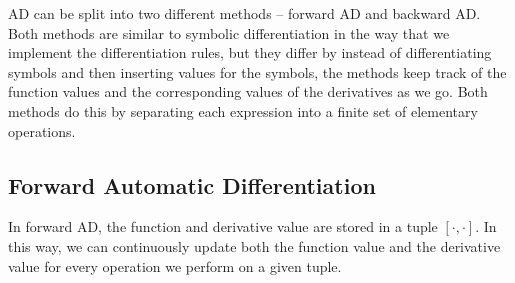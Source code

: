 AD can be split into two different methods -- forward AD and backward AD. Both methods are similar to symbolic differentiation in the way that we implement the differentiation rules, but they differ by instead of differentiating symbols and then inserting values for the symbols, the methods keep track of the function values and the corresponding values of the derivatives as we go. Both methods do this by separating each expression into a finite set of elementary operations. 

\subsection{Forward Automatic Differentiation}
In forward AD, the function and derivative value are stored in a tuple $[\cdot, \cdot]$. In this way, we can continuously update both the function value and the derivative value for every operation we perform on a given tuple. 

